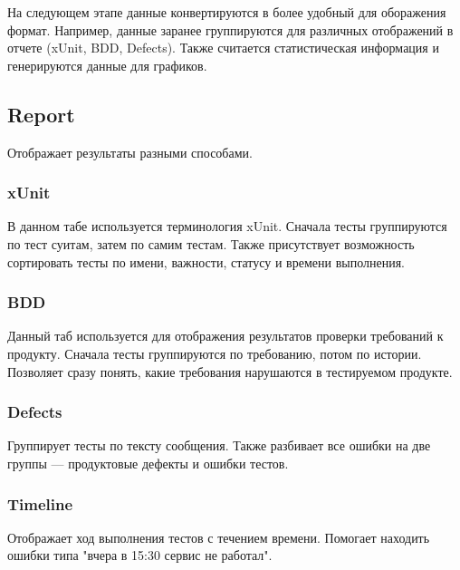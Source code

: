 На следующем этапе данные конвертируются в более удобный для оборажения формат. Например, данные заранее группируются для различных отображений в отчете (xUnit, BDD, Defects). Также считается статистическая информация и генерируются данные для графиков.

\subsection{Report}

Отображает результаты разными способами. 

\subsubsection{xUnit}

В данном табе используется терминология xUnit. Сначала тесты группируются по тест суитам, затем по самим тестам. Также присутствует возможность сортировать тесты по имени, важности, статусу и времени выполнения.

\subsubsection{BDD}

Данный таб используется для отображения результатов проверки требований к продукту. Сначала тесты группируются по требованию, потом по истории. Позволяет сразу понять, какие требования нарушаются в тестируемом продукте.

\subsubsection{Defects}

Группирует тесты по тексту сообщения. Также разбивает все ошибки на две группы --- продуктовые дефекты и ошибки тестов. 

\subsubsection{Timeline}

Отображает ход выполнения тестов с течением времени. Помогает находить ошибки типа "вчера в 15:30 сервис не работал".
